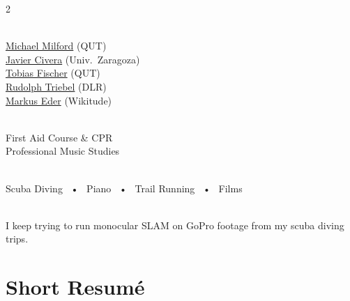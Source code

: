 \documentclass[lighthipster]{simplehipstercv}
\begin{document}
\begin{paracol}{2}
{\bigskip

\\[0.5em]
\href{mailto:michael.milford@qut.edu.au}{Michael Milford} {\scriptsize\color{black!60}(QUT)} \\
 \href{mailto:jcivera@unizar.es}{Javier Civera} {\scriptsize\color{black!60}(Univ.\ Zaragoza)} \\
\href{mailto:tobias.fischer@qut.edu.au}{Tobias Fischer} {\scriptsize\color{black!60}(QUT)} \\
\href{mailto:Rudolph.Triebel@dlr.de}{Rudolph Triebel} {\scriptsize\color{black!60}(DLR)} \\
 \href{mailto:markus.eder@wikitude.com}{Markus Eder} {\scriptsize\color{black!60}(Wikitude)}

\bigskip

\\[0.5em]
First Aid Course \& CPR \\
Professional Music Studies \\

\bigskip

\\[0.5em]
Scuba Diving ~•~ Piano ~•~ Trail Running ~•~ Films

\bigskip

\\[0.5em]
{\footnotesize I keep trying to run monocular SLAM on GoPro footage from my scuba diving trips.}

}
\switchcolumn

\small
\section*{Short Resumé}


\end{paracol}
\end{document}
